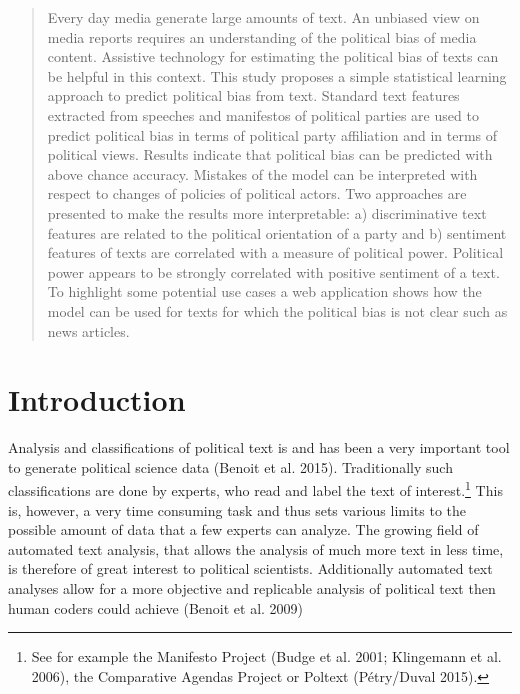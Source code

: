 \documentclass{article}
\begin{document}

\begin{abstract}
Every day media generate large amounts of text. An unbiased view on media reports requires an understanding of the political bias of media content. Assistive technology for estimating the political bias of texts can be helpful in this context. This study proposes a simple statistical learning approach to predict political bias from text. Standard text features extracted from speeches and manifestos of political parties are used to predict political bias in terms of political party affiliation and in terms of political views. Results indicate that political bias can be predicted with above chance accuracy. Mistakes of the model can be interpreted with respect to changes of policies of political actors. Two approaches are presented to make the results more interpretable: a) discriminative text features are related to the political orientation of a party and b) sentiment features of texts are correlated with a measure of political power. Political power appears to be strongly correlated with positive sentiment of a text. To highlight some potential use cases a web application shows how the model can be used for texts for which the political bias is not clear such as news articles.
\end{abstract}

\section{Introduction}
\label{sec:intro}
%
Analysis and classifications of political text is and has been a very important tool to generate political science data (Benoit et al. 2015). Traditionally such classifications are done by experts, who read and label the text of interest.\footnote{See for example the Manifesto Project (Budge et al. 2001; Klingemann et al. 2006), the Comparative Agendas Project or Poltext (Pétry/Duval 2015).} This is, however, a very time consuming task and thus sets various limits to the possible amount of data that a few experts can analyze. The growing field of automated text analysis, that allows the analysis of much more text in less time, is therefore of great interest to political scientists. Additionally automated text analyses allow for a more objective and replicable analysis of political text then human coders could achieve (Benoit et al. 2009)
\end{document}
